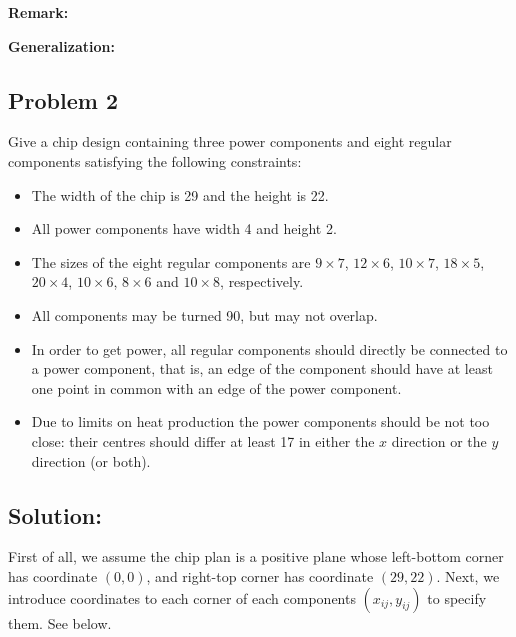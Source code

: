 \documentclass[11pt]{article}
\begin{document}
{\vspace{3mm}

{\bf Remark:}

\vspace{3mm}

{\bf Generalization:}


\vspace{5mm}

\subsection*{Problem 2}

Give a chip design containing three power components and eight regular components satisfying the following constraints:
\begin{itemize}
  \item The width of the chip is 29 and the height is 22.
  \item All power components have width 4 and height 2.
  \item The sizes of the eight regular components are $9 \times 7$, $12 \times 6$, $10 \times 7$, $18 \times 5$, $20 \times 4$, $10 \times 6$, $8 \times 6$ and $10 \times 8$, respectively.
  \item All components may be turned 90, but may not overlap.
  \item In order to get power, all regular components should directly be connected to a power component, that is, an edge of the component should have at least one point in common with an edge of the power component.
  \item Due to limits on heat production the power components should be not too close: their centres should differ at least 17 in either the $x$ direction or the $y$ direction (or both).
\end{itemize}

\vspace{4mm}

\subsection*{Solution:}
First of all, we assume the chip plan is a positive plane whose left-bottom corner has coordinate $(0, 0)$, and right-top corner has coordinate $(29, 22)$.
Next, we introduce coordinates to each corner of each components $(x_{ij}, y_{ij})$ to specify them.
See below.

}
\end{document}
